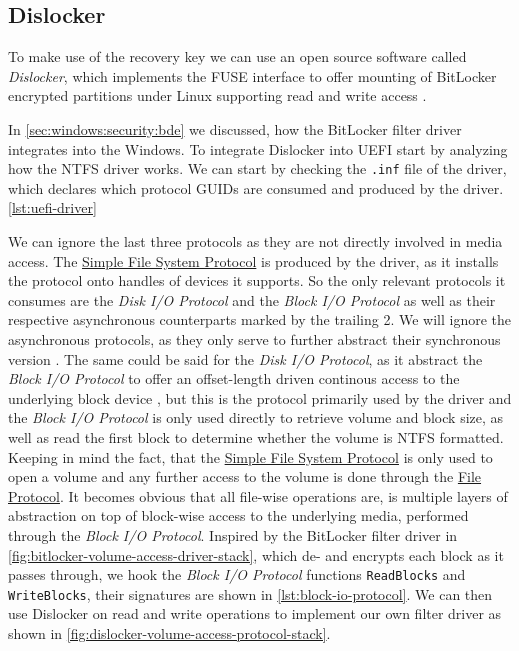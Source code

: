 \subsection{Dislocker}

To make use of the recovery key we can use an open source software called \emph{Dislocker}, which implements the \ac{FUSE} interface to offer mounting of BitLocker encrypted partitions under Linux supporting read and write access \cite{dislocker}.

In \autoref{sec:windows:security:bde} we discussed, how the BitLocker filter driver integrates into the Windows.
To integrate Dislocker into \ac{UEFI} start by analyzing how the \ac{NTFS} driver works.
We can start by checking the \lstinline{.inf} file of the driver, which declares which protocol \acp{GUID} are consumed and produced by the driver. \autoref{lst:uefi-driver}



We can ignore the last three protocols as they are not directly involved in media access.
The \hyperref[lst:simple-file-system-protocol]{Simple File System Protocol} is produced by the driver, as it installs the protocol onto handles of devices it supports.
So the only relevant protocols it consumes are the \emph{Disk \ac{I/O} Protocol} and the \emph{Block \ac{I/O} Protocol} as well as their respective asynchronous counterparts marked by the trailing 2.
We will ignore the asynchronous protocols, as they only serve to further abstract their synchronous version \cite[13.8 and 13.10]{uefi-spec}.
The same could be said for the \emph{Disk \ac{I/O} Protocol}, as it abstract the \emph{Block \ac{I/O} Protocol} to offer an offset-length driven continous access to the underlying block device \cite[Section 13.7]{uefi-spec}, but this is the protocol primarily used by the driver and the \emph{Block \ac{I/O} Protocol} is only used directly to retrieve volume and block size, as well as read the first block to determine whether the volume is \ac{NTFS} formatted.
Keeping in mind the fact, that the \hyperref[lst:simple-file-system-protocol]{Simple File System Protocol} is only used to open a volume and any further access to the volume is done through the \hyperref[lst:simple-file-system-protocol]{File Protocol}.
It becomes obvious that all file-wise operations are, is multiple layers of abstraction on top of block-wise access to the underlying media, performed through the \emph{Block \ac{I/O} Protocol}.
Inspired by the BitLocker filter driver in \autoref{fig:bitlocker-volume-access-driver-stack}, which de- and encrypts each block as it passes through, we hook the \emph{Block \ac{I/O} Protocol} functions \lstinline{ReadBlocks} and \lstinline{WriteBlocks}, their signatures are shown in \autoref{lst:block-io-protocol}.
We can then use Dislocker on read and write operations to implement our own filter driver as shown in \autoref{fig:dislocker-volume-access-protocol-stack}.


